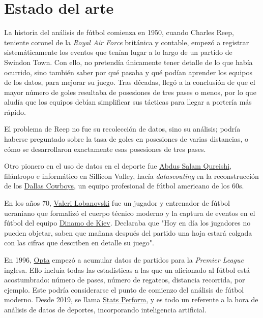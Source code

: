 \chapter{Estado del arte}
La historia del análisis de fútbol comienza en 1950, cuando Charles Reep\cite{reep-bio}, teniente coronel de 
la \textit{Royal Air Force} británica y contable, empezó a 
registrar sistemáticamente los eventos que tenían lugar a lo largo de un partido de Swindon Town. Con ello, no pretendía 
únicamente tener detalle de lo que había ocurrido, sino también saber por qué pasaba y qué podían aprender los 
equipos de los datos, para mejorar su juego. Tras décadas, llegó a la conclusión de que el mayor número 
de goles resultaba de posesiones de tres pases o menos, por lo que aludía que los equipos debían simplificar 
sus tácticas para llegar a portería más rápido.

El problema de Reep no fue su recolección de datos, sino su análisis; podría haberse preguntado sobre 
la tasa de goles en posesiones de varias distancias, o cómo se desarrollaron exactamente esas 
posesiones de tres pases. 

Otro pionero en el uso de datos en el deporte fue \href{http://www.riazhaq.com/2022/08/remembering-salam-qureishi-pillar-of.html}{Abdus Salam Qureishi}, 
filántropo e informático en Sillicon Valley, hacía \textit{datascouting} en la reconstrucción de los 
\href{https://www.dallascowboys.com/}{Dallas Cowboys}, un equipo profesional de fútbol americano de los 60s\cite{chazan2020sports}.

En los años 70, \href{https://es.wikipedia.org/wiki/Valeri_Lobanovski}{Valeri Lobanovski} fue un jugador y entrenador de 
fútbol ucraniano que formalizó el cuerpo técnico moderno y la captura de eventos en el fútbol del equipo \href{https://es.wikipedia.org/wiki/F._C._Dinamo_de_Kiev}{Dinamo de 
Kiev}. Declaraba que "Hoy en día los jugadores no pueden objetar, saben que mañana después del partido una hoja estará colgada con 
las cifras que describen en detalle su juego"\cite{kilpatrick2011inverting}.

En 1996, \href{https://es.wikipedia.org/wiki/Opta_Sports}{Opta} empezó a acumular datos de partidos para la 
\textit{Premier League} inglesa. Ello incluía todas las estadísticas a las que un aficionado al fútbol está 
acostumbrado: número de pases, número de regateos, distancia recorrida, por ejemplo. Este podría considerarse 
el punto de comienzo del análisis de fútbol moderno. Desde 2019, se llama \href{https://www.statsperform.com/}{Stats Perform}, y 
es todo un referente a la hora de análisis de datos de deportes, incorporando inteligencia artificial.

